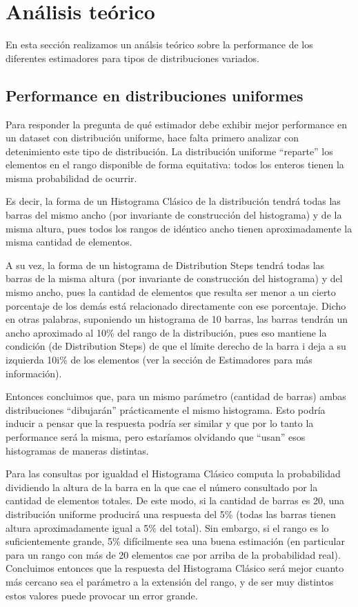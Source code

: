 \section{Análisis teórico}
En esta sección realizamos un análsis teórico sobre la performance de los diferentes estimadores para tipos de distribuciones variados.

\subsection{Performance en distribuciones uniformes}
Para responder la pregunta de qué estimador debe exhibir mejor performance en un dataset con distribución uniforme, hace falta primero analizar con detenimiento este tipo de distribución. La distribución uniforme ``reparte'' los elementos en el rango disponible de forma equitativa: todos los enteros tienen la misma probabilidad de ocurrir.

Es decir, la forma de un Histograma Clásico de la distribución tendrá todas las barras del mismo ancho (por invariante de construcción del histograma) y de la misma altura, pues todos los rangos de idéntico ancho tienen aproximadamente la misma cantidad de elementos.

A su vez, la forma de un histograma de Distribution Steps tendrá todas las barras de la misma altura (por invariante de construcción del histograma) y del mismo ancho, pues la cantidad de elementos que resulta ser menor a un cierto porcentaje de los demás está relacionado directamente con ese porcentaje. Dicho en otras palabras, suponiendo un histograma de 10 barras, las barras tendrán un ancho aproximado al 10\% del rango de la distribución, pues eso mantiene la condición (de Distribution Steps) de que el límite derecho de la barra i deja a su izquierda 10i\% de los elementos (ver la sección de Estimadores para más información).

Entonces concluimos que, para un mismo parámetro (cantidad de barras) ambas distribuciones ``dibujarán'' prácticamente el mismo histograma. Esto podría inducir a pensar que la respuesta podría ser similar y que por lo tanto la performance será la misma, pero estaríamos olvidando que ``usan'' esos histogramas de maneras distintas.

Para las consultas por igualdad el Histograma Clásico computa la probabilidad dividiendo la altura de la barra en la que cae el número consultado por la cantidad de elementos totales. De este modo, si la cantidad de barras es 20, una distribución uniforme producirá una respuesta del 5\% (todas las barras tienen altura aproximadamente igual a 5\% del total). Sin embargo, si el rango es lo suficientemente grande, 5\% difícilmente sea una buena estimación (en particular para un rango con más de 20 elementos cae por arriba de la probabilidad real). Concluimos entonces que la respuesta del Histograma Clásico será mejor cuanto más cercano sea el parámetro a la extensión del rango, y de ser muy distintos estos valores puede provocar un error grande.

